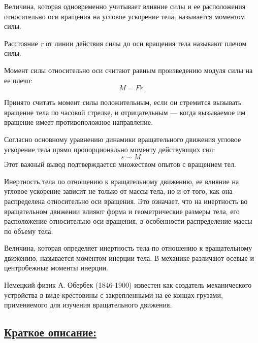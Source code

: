 \documentclass[14pt,a4paper,oneside]{extarticle}	%
\begin{document}
	Величина, которая одновременно учитывает влияние силы и ее 
	расположения относительно оси вращения на угловое ускорение 
	тела, называется моментом силы. 
	
	Расстояние \textit{r} от линии действия силы до оси вращения тела называют плечом силы. 
	
	Момент силы относительно оси считают равным произведению модуля силы на ее плечо: $$ M=Fr. $$
	
	Принято считать момент силы положительным, если он стремится вызывать вращение тела по часовой стрелке, и отрицательным — когда вызываемое им вращение имеет противоположное направление. 
	
	Согласно основному уравнению динамики вращательного движения угловое ускорение тела прямо пропорционально моменту действующих сил: $$ \varepsilon \sim M. $$
	Этот важный вывод подтверждается множеством опытов с вращением тел.
	
	Инертность тела по отношению к вращательному движению, ее влияние на угловое ускорение зависит не только от массы тела, но и от того, как она распределена относительно оси вращения. 
	Это означает, что на инертность во вращательном движении влияют форма и геометрические размеры тела, его расположение относительно оси вращения, в особенности распределение массы по объему тела. 
	
	Величина, которая определяет инертность тела по отношению к вращательному движению, называется моментом инерции тела.
	В механике различают осевые и центробежные моменты инерции. 
	
	Немецкий физик А. Обербек (1846-1900) известен как создатель механического устройства в виде крестовины с закрепленными на ее концах грузами, применяемого для изучения вращательного движения.

	\newpage	
		\subsection*{\underline{Краткое описание:}}
		
\end{document}
